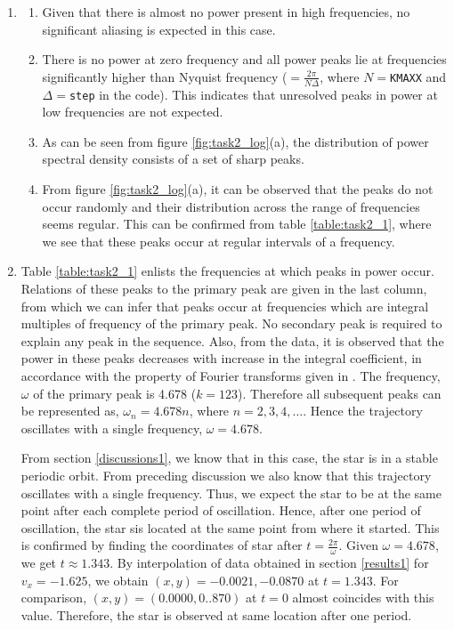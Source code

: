 \documentclass[a4paper]{article}
\begin{document}
		\begin{enumerate}
		
			\item \begin{enumerate}
				\item Given that there is almost no power present in high frequencies, no significant aliasing is expected in this case.
				\item There is no power at zero frequency and all power peaks lie at frequencies significantly higher than Nyquist frequency (\(= \frac{2 \pi}{N \Delta}\), where \(N=\)\texttt{KMAXX} and \(\Delta=\)\texttt{step} in the code). This indicates that unresolved peaks in power at low frequencies are not expected.
				\item As can be seen from figure \ref{fig:task2_log}(a), the distribution of power spectral density consists of a set of sharp peaks.
				\item From figure \ref{fig:task2_log}(a), it can be observed that the peaks do not occur randomly and their distribution across the range of frequencies seems regular. This can be confirmed from table \ref{table:task2_1}, where we see that these peaks occur at regular intervals of a frequency. 
			\end{enumerate}
		
			\item Table \ref{table:task2_1} enlists the frequencies at which peaks in power occur. Relations of these peaks to the primary peak are given in the last column, from which we can infer that peaks occur at frequencies which are integral multiples of frequency of the primary peak. No secondary peak is required to explain any peak in the sequence. Also, from the data, it is observed that the power in these peaks decreases with increase in the integral coefficient, in accordance with the property of Fourier transforms given in \cite{lecture_4}. The frequency, \(\omega\) of the primary peak is 4.678 (\(k=123\)). Therefore all subsequent peaks can be represented as, \(\omega_n=4.678n\), where \(n=2, 3, 4, \dots\). Hence the trajectory oscillates with a single frequency, \(\omega = 4.678\).
			
			From section \ref{discussions1}, we know that in this case, the star is in a stable periodic orbit. From preceding discussion we also know that this trajectory oscillates with a single frequency. Thus, we expect the star to be at the same point after each complete period of oscillation. Hence, after one period of oscillation, the star sis located at the same point from where it started. This is confirmed by finding the coordinates of star after \(t=\frac{2\pi}{\omega}\). Given \(\omega=4.678\), we get \(t \approx 1.343\). By interpolation of data obtained in section \ref{results1} for \(v_x=-1.625\), we obtain \((x,y)={-0.0021,-0.0870}\) at \(t=1.343\). For comparison, \((x,y)=(0.0000,0..870)\) at \(t=0\) almost coincides with this value. Therefore, the star is observed at same location after one period. 
			

\end{enumerate}
\end{document}
